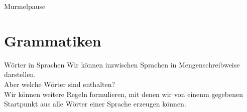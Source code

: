 


\begin{frame}[standout]
  Murmelpause
\end{frame}

\section{Grammatiken}

\begin{frame}[fragile]{Wörter in Sprachen}
Wir können inzwischen Sprachen in Mengenschreibweise darstellen.\\Aber welche Wörter sind enthalten?\\
\vspace{0.3cm}
Wir können weitere Regeln formulieren, mit denen wir von einenm gegebenen Startpunkt aus alle Wörter einer Sprache erzeugen können.
\end{frame}


